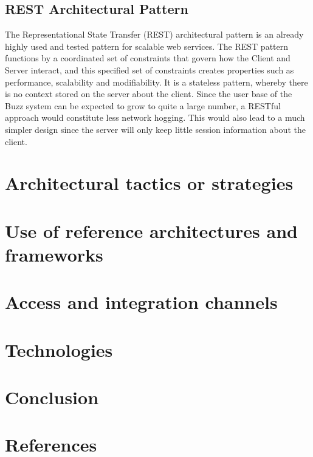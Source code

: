 \documentclass[12pt]{article}
\begin{document}
\subsection{REST Architectural Pattern}
The Representational State Transfer (REST) architectural pattern is an already highly used and tested pattern for scalable web services.
The REST pattern functions by a coordinated set of constraints that govern how the Client and Server interact, and this specified set of constraints creates properties such as performance, scalability and modifiability. 
It is a stateless pattern, whereby there is no context stored on the server about the client.
Since the user base of the Buzz system can be expected to grow to quite a large number, a RESTful approach would constitute less network hogging. This would also lead to a much simpler design since the server will only keep little session information about the client.

\section{Architectural tactics or strategies}

\section{Use of reference architectures and frameworks}

\section{Access and integration channels}

\section{Technologies}

\section{Conclusion}

\section{References}
\end{document}
